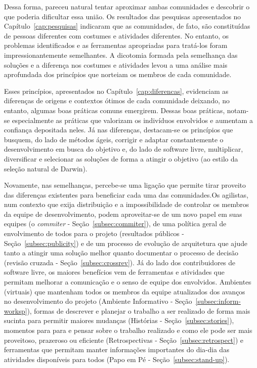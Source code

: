 Dessa forma, pareceu natural tentar aproximar ambas comunidades e
descobrir o que poderia dificultar essa união. Os resultados das
pesquisas apresentados no Capítulo~\ref{cap:pesquisas} indicaram que
as comunidades, de fato, são constituídas de pessoas diferentes com
costumes e atividades diferentes. No entanto, os problemas
identificados e as ferramentas apropriadas para tratá-los foram
impressionantemente semelhantes.  A dicotomia formada pela semelhança
das soluções e a diferença nos costumes e atividades levou a uma
análise mais aprofundada dos princípios que norteiam os membros de
cada comunidade.

Esses princípios, apresentados no Capítulo~\ref{cap:diferencas},
evidenciam as diferenças de origens e contextos ótimos de cada
comunidade deixando, no entanto, algumas boas práticas comuns
emergirem. Dessas boas práticas, notam-se especialmente as práticas
que valorizam os indivíduos envolvidos e aumentam a confiança
depositada neles. Já nas diferenças, destacam-se os princípios que
busquem, do lado de métodos ágeis, corrigir e adaptar constantemente o
desenvolvimento em busca do objetivo e, do lado de software livre,
multiplicar, diversificar e selecionar as soluções de forma a atingir
o objetivo (ao estilo da seleção natural de Darwin).

Novamente, nas semelhanças, percebe-se uma ligação que permite tirar
proveito das diferenças existentes para beneficiar cada uma das
comunidades.Os agilistas, num contexto que exija distribuição e a
impossibilidade de controlar os membros da equipe de desenvolvimento,
podem aproveitar-se de um novo papel em suas equipes (o
\emph{commiter} - Seção~\ref{subsec:commiter}), de uma política geral
de envolvimento de todos para o projeto (resultados públicos -
Seção~\ref{subsec:publicity}) e de um processo de evolução de
arquitetura que ajude tanto a atingir uma solução melhor quanto
documentar o processo de decisão (revisão cruzada -
Seção~\ref{subsec:crossrev}).  Já do lado dos contribuidores de
software livre, os maiores benefícios vem de ferramentas e atividades
que permitam melhorar a comunicação e o senso de equipe dos
envolvidos. Ambientes (virtuais) que mantenham todos os membros da
equipe atualizados dos avanços no desenvolvimento do projeto (Ambiente
Informativo - Seção~\ref{subsec:inform-worksp}), formas de descrever e
planejar o trabalho a ser realizado de forma mais sucinta para
permitir maiores mudanças (Histórias - Seção~\ref{subsec:stories}),
momentos para para e pensar sobre o trabalho realizado e como ele pode
ser mais proveitoso, prazeroso ou eficiente (Retrospectivas -
Seção~\ref{subsec:retrospect}) e ferramentas que permitam manter
informações importantes do dia-dia das atividades disponíveis para
todos (Papo em Pé - Seção~\ref{subsec:stand-up}).

